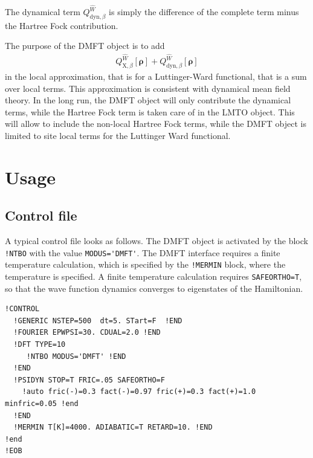 \documentclass[11pt,a4paper]{report}
\newcommand{\mat}[1]{\bm{#1}}  %
\begin{document}
The dynamical term $Q_{\text{dyn},\beta}^{\hat{W}}$
is simply the difference of the complete term minus
the Hartree Fock contribution.

The purpose of the DMFT object is to add
\begin{eqnarray}
  Q_{\text{X},\beta}^{\hat{W}}[\mat{\rho}]
  +Q_{\text{dyn},\beta}^{\hat{W}}[\mat{\rho}]
\end{eqnarray}
in the local approximation, that is for a Luttinger-Ward functional,
that is a sum over local terms. This approximation is consistent with
dynamical mean field theory. In the long run, the DMFT object will
only contribute the dynamical terms, while the Hartree Fock term is
taken care of in the LMTO object. This will allow to include the
non-local Hartree Fock terms, while the DMFT object is limited to site
local terms for the Luttinger Ward functional.

\section{Usage}
\subsection{Control file}
A typical control file looks as follows. The DMFT object is activated
by the block \verb|!NTBO| with the value \verb|MODUS='DMFT'|. The DMFT
interface requires a finite temperature calculation, which is
specified by the \verb|!MERMIN| block, where the temperature is
specified.  A finite temperature calculation requires
\verb|SAFEORTHO=T|, so that the wave function dynamics converges to
eigenstates of the Hamiltonian.
\begin{verbatim}
!CONTROL
  !GENERIC NSTEP=500  dt=5. STart=F  !END 
  !FOURIER EPWPSI=30. CDUAL=2.0 !END
  !DFT TYPE=10  
     !NTBO MODUS='DMFT' !END   
  !END 
  !PSIDYN STOP=T FRIC=.05 SAFEORTHO=F
    !auto fric(-)=0.3 fact(-)=0.97 fric(+)=0.3 fact(+)=1.0 minfric=0.05 !end
  !END
  !MERMIN T[K]=4000. ADIABATIC=T RETARD=10. !END
!end
!EOB
\end{verbatim}

\end{document}
